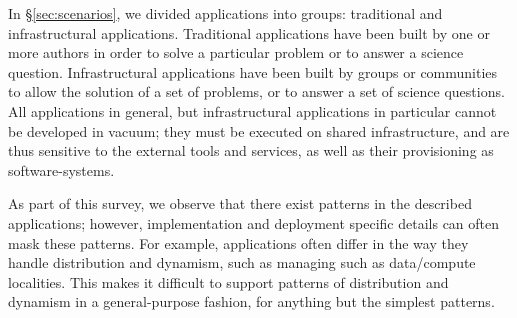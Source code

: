 

In \S\ref{sec:scenarios}, we divided applications into groups: traditional and
infrastructural applications.  Traditional applications have been built by one
or more authors in order to solve a particular problem or to answer a science
question.  Infrastructural applications have been built by groups or communities
to allow the solution of a set of problems, or to answer a set of science
questions. All applications in general, but infrastructural applications in
particular cannot be developed in vacuum; they must be executed on shared
infrastructure, and are thus sensitive to the external tools and services, as
well as their provisioning as software-systems.

As part of this survey, we observe that there exist patterns in the described
applications; however, implementation and deployment specific details can often
mask these patterns.  For example, applications often differ in the way they
handle distribution and dynamism, such as managing such as data/compute
localities. This makes it difficult to support patterns of distribution and
dynamism in a general-purpose fashion, for anything but the simplest patterns.



